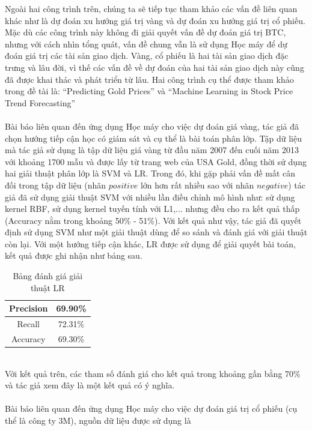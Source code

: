 Ngoài hai công trình trên, chúng ta sẽ tiếp tục tham khảo các vấn đề liên quan 
khác như là dự đoán xu hướng giá trị vàng và dự đoán xu hướng giá trị cổ phiếu.
Mặc dù các công trình này không đi giải quyết vấn đề dự đoán giá trị BTC, nhưng 
với cách nhìn tổng quát, vấn đề chung vẫn là sử dụng Học máy để dự đoán giá trị 
các tài sản giao dịch. Vàng, cổ phiếu là hai tài sản giao dịch đặc trưng và lâu 
đời, vì thế các vấn đề về dự đoán của hai tài sản giao dịch này cũng đã được 
khai thác và phát triển từ lâu. Hai công trình cụ thể được tham khảo trong đề tài là: 
``Predicting Gold Prices'' \cite{PredictingGoldPrices} và 
``Machine Learning in Stock Price Trend Forecasting'' 
\cite{StockPriceTrendForecasting} \\\\ 
Bài báo \cite{PredictingGoldPrices} liên quan đến ứng dụng Học máy cho việc dự đoán 
giá vàng, tác giả đã chọn hướng tiếp cận học có giám sát và cụ thể là bài toán 
phân lớp. Tập dữ liệu mà tác giả sử dụng là tập dữ liệu giá vàng từ đầu năm 2007 
đến cuối năm 2013 với khoảng 1700 mẫu và được lấy từ trang web của USA Gold, 
đồng thời sử dụng hai giải thuật phân lớp là SVM và LR.
Trong đó, khi gặp phải vấn đề mất cân đối trong tập dữ liệu (nhãn $positive$ 
lớn hơn rất nhiều sao với nhãn $negative$) tác giả đã sử dụng giải thuật SVM 
với nhiều lần điều chỉnh mô hình như: sử dụng kernel RBF, sử dụng kernel tuyến 
tính với L1,... nhưng đều cho ra kết quả thấp (Accuracy nằm trong khoảng 50\% 
- 51\%). Với kết quả như vậy, tác giả đã quyết định sử dụng SVM như một giải 
thuật dùng để so sánh và đánh giá với giải thuật còn lại. Với một hướng tiếp 
cận khác, LR được sử dụng để giải quyết bài toán, kết quả được ghi nhận như 
bảng sau.
\begin{table}[h]
\centering
\fontsize{8}{9}\selectfont
\begin{tabular}{ |c|c| }
\hline
Precision & 69.90\% \\
\hline
Recall & 72.31\% \\
\hline
Accuracy & 69.30\% \\
\hline
\end{tabular}
\caption{Bảng đánh giá giải thuật LR}
\end{table}\\
Với kết quả trên, các tham số đánh giá cho kết quả trong khoảng gần bằng 70\% 
và tác giả xem đây là một kết quả có ý nghĩa.\\\\
Bài báo \cite{StockPriceTrendForecasting} liên quan đến ứng dụng Học máy cho việc 
dự đoán giá trị cổ phiếu (cụ thể là công ty 3M), nguồn dữ liệu được sử dụng là 
